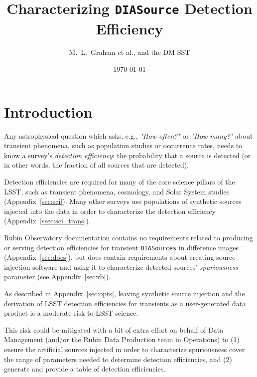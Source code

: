 \documentclass[DM,lsstdraft,toc]{lsstdoc}
\title[Detection Efficiencies]{Characterizing {\tt DIASource} Detection Efficiency}
\author{M.~L.~Graham et al., and the DM SST}
\date{\today}
\begin{document}
\maketitle



\section{Introduction} \label{sec:intro}

Any astrophysical question which asks, e.g., {\it "How often?"} or {\it "How many?"} about transient phenomena, such as population studies or occurrence rates, needs to know a survey's {\it detection efficiency}: the probability that a source is detected (or in other words, the fraction of all sources that are detected).

Detection efficiencies are required for many of the core science pillars of the LSST, such as transient phenomena, cosmology, and Solar System studies  (Appendix~\ref{sec:sci}).
Many other surveys use populations of synthetic sources injected into the data in order to characterize the detection efficiency (Appendix~\ref{ssec:sci_trans}).

Rubin Observatory documentation contains no requirements related to producing or serving detection efficiencies for transient {\tt DIASources} in difference images (Appendix~\ref{sec:docs}), but does contain requirements about creating source injection software and using it to characterize detected sources' {\it spuriousness} parameter (see Appendix~\ref{sec:rb}).

As described in Appendix~\ref{sec:opts}, leaving synthetic source injection and the derivation of LSST detection efficiencies for transients as a user-generated data product is a moderate risk to LSST science.

This risk could be mitigated with a bit of extra effort on behalf of Data Management (and/or the Rubin Data Production team in Operations) to (1) ensure the artificial sources injected in order to characterize spuriousness cover the range of parameters needed to determine detection efficiencies, and (2) generate and provide a table of detection efficiencies.
\end{document}
